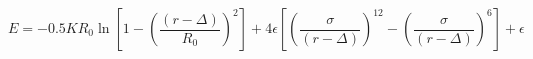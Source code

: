 \documentclass[12pt]{article}
\begin{document}
$$ 
  E = -0.5 K R_0 
  \ln \left[1 -\left( \frac{\left(r - \Delta\right)}{R_0}\right)^2 \right] + 
  4 \epsilon \left[ \left(\frac{\sigma}{\left(r - 
      \Delta\right)}\right)^{12} - \left(\frac{\sigma}{\left(r - 
      \Delta\right)}\right)^6 \right] + \epsilon
$$
\end{document}
